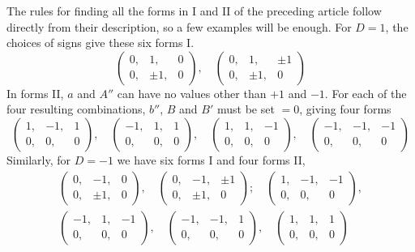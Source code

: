 The rules for finding all the forms in I and II of the preceding article follow directly from their description, so a few examples will be enough. For \(D=1\), the choices of signs give these six forms I.
\[
\left(\begin{smallmatrix}0,&1,&0\\0,&\pm1,&0\end{smallmatrix}\right),\quad
\left(\begin{smallmatrix}0,&1,&\pm1\\0,&\pm1,&0\end{smallmatrix}\right)
\]
In forms II, \(a\) and \(A''\) can have no values other than \(+1\) and \(-1\). For each of the four resulting combinations, \(b''\), \(B\) and \(B'\) must be set \(=0\), giving four forms
\[
\left(\begin{smallmatrix}1,&-1,&1\\0,&0,&0\end{smallmatrix}\right),\quad
\left(\begin{smallmatrix}-1,&1,&1\\0,&0,&0\end{smallmatrix}\right),\quad
\left(\begin{smallmatrix}1,&1,&-1\\0,&0,&0\end{smallmatrix}\right),\quad
\left(\begin{smallmatrix}-1,&-1,&-1\\0,&0,&0\end{smallmatrix}\right)
\]
Similarly, for \(D=-1\) we have six forms I and four forms II,
\[
\begin{gathered}
\left(\begin{smallmatrix}0,&-1,&0\\0,&\pm1,&0\end{smallmatrix}\right),\quad
\left(\begin{smallmatrix}0,&-1,&\pm1\\0,&\pm1,&0\end{smallmatrix}\right);\quad
\left(\begin{smallmatrix}1,&-1,&-1\\0,&0,&0\end{smallmatrix}\right),\\
\left(\begin{smallmatrix}-1,&1,&-1\\0,&0,&0\end{smallmatrix}\right),\quad
\left(\begin{smallmatrix}-1,&-1,&1\\0,&0,&0\end{smallmatrix}\right),\quad
\left(\begin{smallmatrix}1,&1,&1\\0,&0,&0\end{smallmatrix}\right)
\end{gathered}
\]

